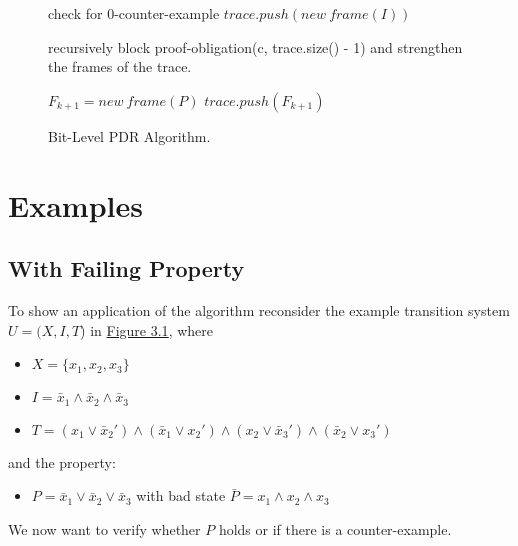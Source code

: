 \documentclass[11pt, a4paper, BCOR=10mm, ngerman]{scrbook}
\begin{document}
\begin{figure}
\begin{algorithm}[H] 
\begin{algorithmic}[1]
\State check for 0-counter-example
\State $trace.push(new\ frame(I))$
\Statex
\Loop

        \State recursively block proof-obligation(c, trace.size() - 1)
        \State and strengthen the frames of the trace.
        
         
        \EndIf
        \EndWhile

        \Statex 
        
        \State $F_{k+1} = new\ frame(P)$
        \EndIf
\EndFor
        \EndIf
        \State $trace.push(F_{k+1})$

\EndLoop
\EndProcedure
\end{algorithmic}
\end{algorithm}
\caption{Bit-Level PDR Algorithm.}
\end{figure}

\section{Examples}
 
\subsection{With Failing Property} 
To show an application of the algorithm reconsider the example transition system $U = (X, I, T$) in \hyperref[ex1]{Figure 3.1}, where \par
\begin{itemize}
\item $X = \{x_1, x_2, x_3\}$
\item $I = \bar x_1 \land \bar x_2 \land \bar x_3$
\item $T = (x_1 \lor \bar x_2' ) \land ( \bar x_1 \lor x_2') \land (x_2 \lor \bar x_3') \land ( \bar x_2 \lor x_3')$
\end{itemize}
and the property: 
\begin{itemize}
\item $P = \bar x_1 \lor \bar x_2 \lor \bar x_3$ with bad state $\bar P = x_1 \land x_2 \land x_3$ 
\end{itemize}
We now want to verify whether $P$ holds or if there is a counter-example. \\ \\
\end{document}
